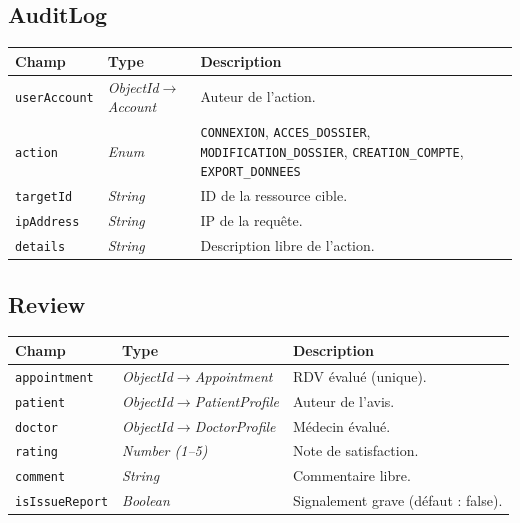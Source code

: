 \documentclass[12pt,a4paper]{report}
\newcommand{\field}[1]{\texttt{\small\textcolor{MedTealDark}{#1}}}
\newcommand{\typ}[1]{\textit{\small\textcolor{CommentGray}{#1}}}
\begin{document}
\subsection{AuditLog}

\begin{center}
\small
\begin{tabularx}{\textwidth}{@{} l l X @{}}
  \toprule
  \textbf{Champ} & \textbf{Type} & \textbf{Description} \\
  \midrule
  \field{userAccount} & \typ{ObjectId$\to$Account} & Auteur de l'action. \\
  \field{action}      & \typ{Enum}                 &
    \texttt{CONNEXION}, \texttt{ACCES\_DOSSIER},
    \texttt{MODIFICATION\_DOSSIER},
    \texttt{CREATION\_COMPTE},
    \texttt{EXPORT\_DONNEES} \\
  \field{targetId}    & \typ{String}               & ID de la ressource cible. \\
  \field{ipAddress}   & \typ{String}               & IP de la requête. \\
  \field{details}     & \typ{String}               & Description libre de l'action. \\
  \bottomrule
\end{tabularx}
\end{center}

\subsection{Review}

\begin{center}
\small
\begin{tabularx}{\textwidth}{@{} l l X @{}}
  \toprule
  \textbf{Champ} & \textbf{Type} & \textbf{Description} \\
  \midrule
  \field{appointment}  & \typ{ObjectId$\to$Appointment}   & RDV évalué (unique). \\
  \field{patient}      & \typ{ObjectId$\to$PatientProfile} & Auteur de l'avis. \\
  \field{doctor}       & \typ{ObjectId$\to$DoctorProfile}  & Médecin évalué. \\
  \field{rating}       & \typ{Number (1--5)}               & Note de satisfaction. \\
  \field{comment}      & \typ{String}                      & Commentaire libre. \\
  \field{isIssueReport}& \typ{Boolean}                     & Signalement grave (défaut : false). \\
  \bottomrule
\end{tabularx}
\end{center}
\end{document}

